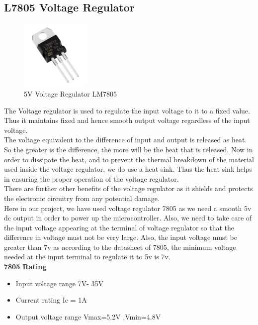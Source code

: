 \subsection{L7805 Voltage Regulator}

\begin{figure}
	\includegraphics[width=0.3\textwidth]{photos/theory/lm7805.jpg}
	\caption{5V Voltage Regulator LM7805}
\end{figure}

The Voltage regulator is used to regulate the input voltage to it to a fixed value. Thus it maintains fixed and hence smooth output voltage regardless of the input voltage.\\
The voltage equivalent to the difference of input and output is released as heat. So the greater is the difference, the more will be the heat that is released. Now in order to dissipate the heat, and to prevent the thermal breakdown of the material used inside the voltage regulator, we do use a heat sink. Thus the heat sink helps in ensuring the proper operation of the voltage regulator.\\  
There are further other benefits of the voltage regulator as it shields and protects the electronic circuitry from any potential damage.\\
Here in our project, we have used voltage regulator 7805 as we need a smooth 5v dc output in order to power up the microcontroller. Also, we need to take care of the input voltage appearing at the terminal of voltage regulator so that the difference in voltage must not be very large. Also, the input voltage must be greater than 7v as according to the datasheet of 7805, the minimum voltage needed at the input terminal to regulate it to 5v is 7v.\\

\textbf{7805 Rating}
\begin{itemize}
	\item Input voltage range 7V- 35V
	\item Current rating Ic = 1A
	\item Output voltage range   V{max}=5.2V ,V{min}=4.8V
\end{itemize}


